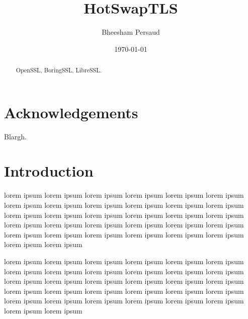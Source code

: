 \documentclass[12pt,oneside]{report}
\author{Bheesham Persaud}
\title{HotSwapTLS}
\date{\today}
\providecommand\phantomsection{}
\begin{document}
\cartitle


\begin{abstract}
	OpenSSL\cite{website:openssl}, BoringSSL\cite{website:boringssl},
	LibreSSL\cite{website:libressl}.
\end{abstract}


\phantomsection
{}
\section*{Acknowledgements}

Blargh.

\cleardoublepage

\tableofcontents
\cleardoublepage

\phantomsection
{}
\listoffigures
\cleardoublepage

\phantomsection
{}
\listoftables
\cleardoublepage


\section{Introduction}

lorem ipsum lorem ipsum lorem ipsum lorem ipsum lorem ipsum lorem ipsum lorem
ipsum lorem ipsum lorem ipsum lorem ipsum lorem ipsum lorem ipsum lorem ipsum
lorem ipsum lorem ipsum lorem ipsum lorem ipsum lorem ipsum lorem ipsum lorem
ipsum lorem ipsum lorem ipsum lorem ipsum lorem ipsum lorem ipsum lorem ipsum
lorem ipsum lorem ipsum lorem ipsum lorem ipsum lorem ipsum lorem ipsum

lorem ipsum lorem ipsum lorem ipsum lorem ipsum lorem ipsum lorem ipsum lorem
ipsum lorem ipsum lorem ipsum lorem ipsum lorem ipsum lorem ipsum lorem ipsum
lorem ipsum lorem ipsum lorem ipsum lorem ipsum lorem ipsum lorem ipsum lorem
ipsum lorem ipsum lorem ipsum lorem ipsum lorem ipsum lorem ipsum lorem ipsum
lorem ipsum lorem ipsum lorem ipsum lorem ipsum lorem ipsum lorem ipsum
\end{document}
